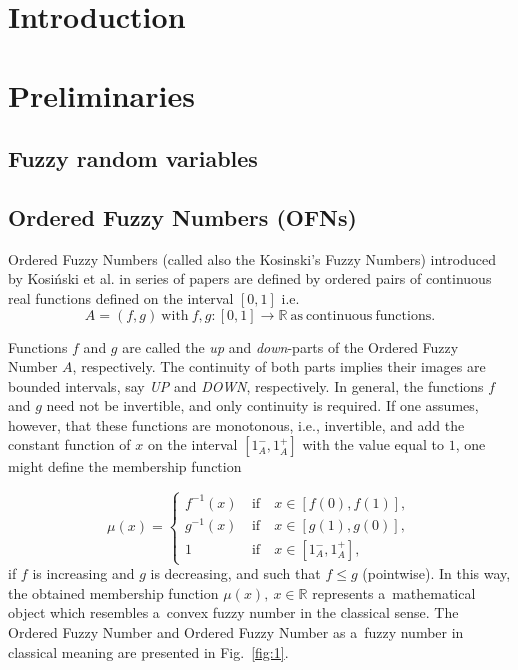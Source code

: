 \documentclass[review]{elsarticle}
\begin{document}
\section{Introduction}



\section{Preliminaries}

\subsection{Fuzzy random variables}

\subsection{Ordered Fuzzy Numbers (OFNs)}
Ordered Fuzzy Numbers (called also the Kosinski's Fuzzy Numbers) introduced by Kosi\'nski et al. in series of papers \cite{kos2002,kos2003a,kos2003b,kos2004,kos2006} are defined by ordered pairs of continuous real functions defined on the interval $[0,1]$ i.e.
\begin{equation}
A=(f,g)\ \mathrm{with}\ f,g\colon[0,1]\to\mathbb{R}\ \mathrm{as\ continuous\ functions}. 
\end{equation} 

Functions $f$ and $g$ are called the \emph{up} and \emph{down}-parts of the Ordered Fuzzy Number $A$, respectively. The continuity of both parts implies their images are bounded intervals, say \emph{UP} and \emph{DOWN}, respectively. In general, the functions $f$ and $g$ need not be invertible, and only continuity is required. If one assumes, however, that these functions are monotonous, i.e., invertible, and add the constant function of $x$ on the interval $[1_A^-,1_A^+]$ with the value equal to $1$, one might define the membership function

\begin{equation}
\label{eq:1}
\mu(x)=\left\{
\begin{array}{ccl}
f^{-1}(x) &\ \mathrm{ if }\ & x\in[f(0),f(1)],\\
g^{-1}(x) &\ \mathrm{ if }\ & x\in[g(1),g(0)],\\
1&\ \mathrm{ if }\ &x\in[1_A^-,1_A^+],
\end{array}
\right.
\end{equation}
if $f$ is increasing and $g$ is decreasing, and such that $f\leq g$ (pointwise). In this way, the obtained membership function $\mu(x),\ x\in\mathbb{R}$ represents a~mathematical object which resembles a~convex fuzzy number in the classical sense. The Ordered Fuzzy Number and Ordered Fuzzy Number as a~fuzzy number in classical meaning are presented in Fig.~\ref{fig:1}.
\end{document}

